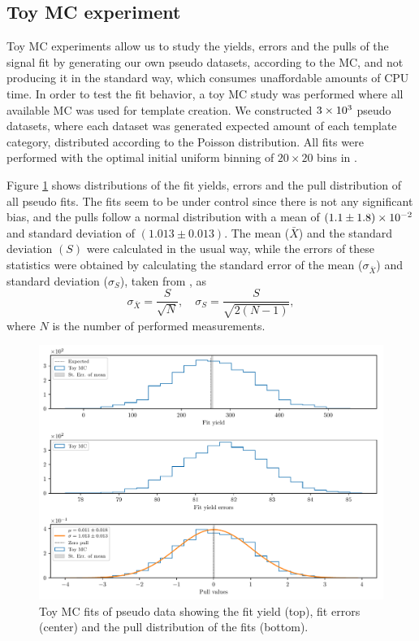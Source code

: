 \subsection{Toy MC experiment}

Toy MC experiments allow us to study the yields, errors and the pulls of the signal fit by generating our own pseudo datasets, according to the MC, and not producing it in the standard way, which consumes unaffordable amounts of CPU time. In order to test the fit behavior, a toy MC study was performed where all available MC was used for template creation. We constructed $3\times 10^{3}$ pseudo datasets, where each dataset was generated expected amount of each template category, distributed according to the Poisson distribution. All fits were performed with the optimal initial uniform binning of $20\times20$ bins in \vars.

Figure \ref{fig:toyMC} shows distributions of the fit yields, errors and the pull distribution of all pseudo fits. The fits seem to be under control since there is not any significant bias, and the pulls follow a normal distribution with a mean of $(1.1\pm1.8)\times 10^{-2}$ and standard deviation of $(1.013\pm0.013)$. The mean ($\bar X$) and the standard deviation $(S)$ were calculated in the usual way, while the errors of these statistics were obtained by calculating the standard error of the mean ($\sigma_{\bar X}$) and standard deviation ($\sigma_S$), taken from \cite{ahn2003standard}, as
\begin{equation}
\sigma_{\bar X} = \frac{S}{\sqrt{N}},\quad \sigma_{S} = \frac{S}{\sqrt{2(N-1)}},
\end{equation}
where $N$ is the number of performed measurements.

\begin{figure}[H]
	\centering
	\captionsetup{width=0.8\linewidth}
	\includegraphics[width=\linewidth]{fig/toyMC}
	\caption{Toy MC fits of pseudo data showing the fit yield (top), fit errors (center) and the pull distribution of the fits (bottom).}
	\label{fig:toyMC}
\end{figure}

